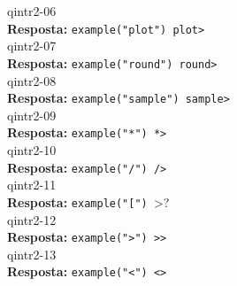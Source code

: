 \documentclass[10pt]{article}
\newcommand{\answer}{\textbf{Resposta: }}
\newcommand{\namequestion}{}
\begin{document}
\namequestion{qintr2-06}
\\ 
\answer{\verb?example("plot") plot>?}\\

\namequestion{qintr2-07}
\\ 
\answer{\verb?example("round") round>?}\\

\namequestion{qintr2-08}
\\ 
\answer{\verb?example("sample") sample>?}\\

\namequestion{qintr2-09}
\\ 
\answer{\verb?example("*") *>?}\\

\namequestion{qintr2-10}
\\ 
\answer{\verb?example("/") />?}\\

\namequestion{qintr2-11}
\qintro2{del símbol $[$}\\ 
\answer{\verb?example("[") ?>?}\\

\namequestion{qintr2-12}
\\ 
\answer{\verb?example(">") >>?}\\

\namequestion{qintr2-13}
\\ 
\answer{\verb?example("<") <>?}\\
\end{document}
